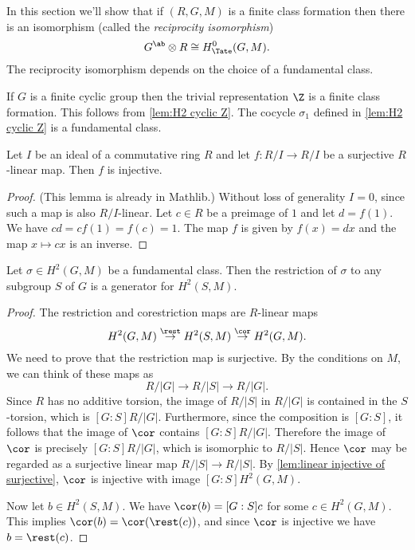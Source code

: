 In this section we'll show that if $(R,G,M)$ is a finite class formation
then there is an isomorphism (called the \emph{reciprocity isomorphism})
\[
	G^{\ab} \otimes R \cong H^0_{\Tate}(G,M).
\]
The reciprocity isomorphism depends on the choice of a fundamental class.

\begin{example}
	If $G$ is a finite cyclic group then the trivial representation $\Z$
	is a finite class formation.
	This follows from \ref{lem:H2 cyclic Z}.
	The cocycle $\sigma_1$ defined in \ref{lem:H2 cyclic Z} is a fundamental class.
\end{example}

\begin{lemma} \label{lem:linear injective of surjective}
	\mathlibok
	Let $I$ be an ideal of a commutative ring $R$ and let $f:R/I \to R/I$
	be a surjective $R$-linear map.
	Then $f$ is injective.
\end{lemma}

\begin{proof}
	\mathlibok
	(This lemma is already in Mathlib.)
	Without loss of generality $I=0$, since such a map is also $R/I$-linear.
	Let $c\in R$ be a preimage of $1$ and let $d = f(1)$.
	We have $cd = cf(1) = f(c) = 1$.
	The map $f$ is given by $f(x) = dx$ and the map $x \mapsto cx$ is an inverse.
\end{proof}

\begin{lemma} \label{lem:restriction fundamental class generates}
	Let $\sigma \in H^2(G,M)$ be a fundamental class.
	Then the restriction of $\sigma$ to any subgroup $S$ of $G$
	is a generator for $H^2(S,M)$.
\end{lemma}

\begin{proof}
	The restriction and corestriction maps are $R$-linear maps
	\[
		H^2(G,M) \stackrel{\rest}\to H^2(S,M) \stackrel{\cor}\to H^2(G,M).
	\]
	We need to prove that the restriction map is surjective.
	By the conditions on $M$, we can think of these maps as
	\[
		R / |G| \to R / |S| \to R / |G|.
	\]
	Since $R$ has no additive torsion, the image of $R/|S|$ in $R/|G|$
	is contained in the $S$-torsion, which is $[G:S] R / |G|$.
	Furthermore, since the composition is $[G:S]$,
	it follows that the image of $\cor$ contains $[G:S] R / |G|$.
	Therefore the image of $\cor$ is precisely $[G:S] R / |G|$, which
	is isomorphic to $R/|S|$. Hence $\cor$ may be regarded as a surjective linear map
	$R/|S| \to R/|S|$.
	By \ref{lem:linear injective of surjective}, $\cor$ is injective with image
	$[G:S] H^2(G,M)$.

	Now let $b \in H^2(S,M)$. We have $\cor(b) = [G:S]c$ for some $c \in H^2(G,M)$.
	This implies $\cor(b) = \cor (\rest( c))$, and since $\cor$ is injective we have
	$b = \rest(c)$.
\end{proof}


